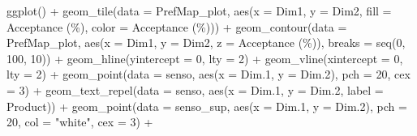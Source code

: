 \documentclass[
]{krantz}
\makeatletter
\newenvironment{Shaded}{\begin{snugshade}}{\end{snugshade}}
\newcommand{\AttributeTok}[1]{\textcolor[rgb]{0.61,0.61,0.61}{#1}}
\newcommand{\DecValTok}[1]{\textcolor[rgb]{0.06,0.06,0.06}{#1}}
\newcommand{\FloatTok}[1]{\textcolor[rgb]{0.06,0.06,0.06}{#1}}
\newcommand{\FunctionTok}[1]{\textcolor[rgb]{0,0,0}{#1}}
\newcommand{\NormalTok}[1]{#1}
\newcommand{\SpecialCharTok}[1]{\textcolor[rgb]{0,0,0}{#1}}
\newcommand{\StringTok}[1]{\textcolor[rgb]{0.5,0.5,0.5}{#1}}
\newenvironment{kframe}{%
\medskip{}
\setlength{\fboxsep}{.8em}
 \def\at@end@of@kframe{}%
 \ifinner\ifhmode%
  \def\at@end@of@kframe{\end{minipage}}%
  \begin{minipage}{\columnwidth}%
 \fi\fi%
 \def\FrameCommand##1{\hskip\@totalleftmargin \hskip-\fboxsep
 \colorbox{shadecolor}{##1}\hskip-\fboxsep
     \hskip-\linewidth \hskip-\@totalleftmargin \hskip\columnwidth}%
 \MakeFramed {\advance\hsize-\width
   \@totalleftmargin\z@ \linewidth\hsize
   \@setminipage}}%
 {\par\unskip\endMakeFramed%
 \at@end@of@kframe}
\renewenvironment{Shaded}{\begin{kframe}}{\end{kframe}}
\makeatother
\begin{document}
\begin{Shaded}
\begin{Highlighting}[]
\FunctionTok{ggplot}\NormalTok{() }\SpecialCharTok{+}
  \FunctionTok{geom\_tile}\NormalTok{(}\AttributeTok{data =}\NormalTok{ PrefMap\_plot, }\FunctionTok{aes}\NormalTok{(}\AttributeTok{x =}\NormalTok{ Dim1, }\AttributeTok{y =}\NormalTok{ Dim2, }
                                     \AttributeTok{fill =} \StringTok{\textasciigrave{}}\AttributeTok{Acceptance (\%)}\StringTok{\textasciigrave{}}\NormalTok{, }
                                     \AttributeTok{color =} \StringTok{\textasciigrave{}}\AttributeTok{Acceptance (\%)}\StringTok{\textasciigrave{}}\NormalTok{)) }\SpecialCharTok{+}
  \FunctionTok{geom\_contour}\NormalTok{(}\AttributeTok{data =}\NormalTok{ PrefMap\_plot, }\FunctionTok{aes}\NormalTok{(}\AttributeTok{x =}\NormalTok{ Dim1, }\AttributeTok{y =}\NormalTok{ Dim2, }
                                        \AttributeTok{z =} \StringTok{\textasciigrave{}}\AttributeTok{Acceptance (\%)}\StringTok{\textasciigrave{}}\NormalTok{), }
               \AttributeTok{breaks =} \FunctionTok{seq}\NormalTok{(}\DecValTok{0}\NormalTok{, }\DecValTok{100}\NormalTok{, }\DecValTok{10}\NormalTok{)) }\SpecialCharTok{+}
  \FunctionTok{geom\_hline}\NormalTok{(}\AttributeTok{yintercept =} \DecValTok{0}\NormalTok{, }\AttributeTok{lty =} \DecValTok{2}\NormalTok{) }\SpecialCharTok{+}
  \FunctionTok{geom\_vline}\NormalTok{(}\AttributeTok{xintercept =} \DecValTok{0}\NormalTok{, }\AttributeTok{lty =} \DecValTok{2}\NormalTok{) }\SpecialCharTok{+}
  \FunctionTok{geom\_point}\NormalTok{(}\AttributeTok{data =}\NormalTok{ senso, }\FunctionTok{aes}\NormalTok{(}\AttributeTok{x =}\NormalTok{ Dim}\FloatTok{.1}\NormalTok{, }\AttributeTok{y =}\NormalTok{ Dim}\FloatTok{.2}\NormalTok{), }
             \AttributeTok{pch =} \DecValTok{20}\NormalTok{, }\AttributeTok{cex =} \DecValTok{3}\NormalTok{) }\SpecialCharTok{+}
  \FunctionTok{geom\_text\_repel}\NormalTok{(}\AttributeTok{data =}\NormalTok{ senso, }\FunctionTok{aes}\NormalTok{(}\AttributeTok{x =}\NormalTok{ Dim}\FloatTok{.1}\NormalTok{, }\AttributeTok{y =}\NormalTok{ Dim}\FloatTok{.2}\NormalTok{, }
                                    \AttributeTok{label =}\NormalTok{ Product)) }\SpecialCharTok{+}
  \FunctionTok{geom\_point}\NormalTok{(}\AttributeTok{data =}\NormalTok{ senso\_sup, }\FunctionTok{aes}\NormalTok{(}\AttributeTok{x =}\NormalTok{ Dim}\FloatTok{.1}\NormalTok{, }\AttributeTok{y =}\NormalTok{ Dim}\FloatTok{.2}\NormalTok{), }
             \AttributeTok{pch =} \DecValTok{20}\NormalTok{, }\AttributeTok{col =} \StringTok{"white"}\NormalTok{, }\AttributeTok{cex =} \DecValTok{3}\NormalTok{) }\SpecialCharTok{+}

\end{Highlighting}
\end{Shaded}
\end{document}
